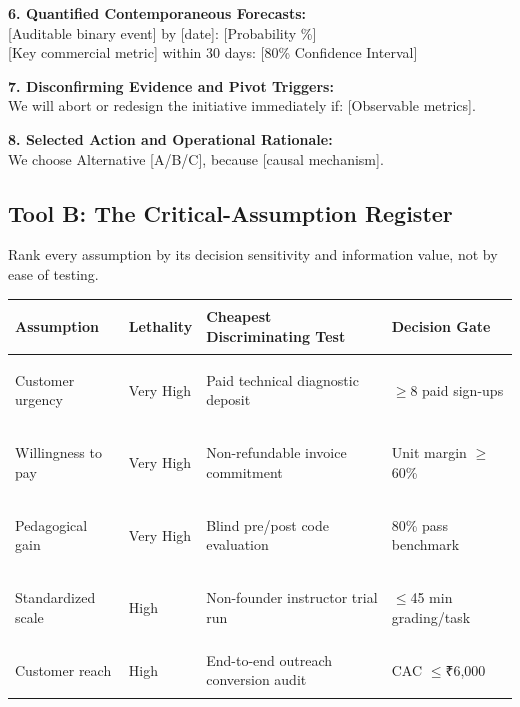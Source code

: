 \begin{tcolorbox}[
  enhanced,
  colback=BayesSurface!60,
  colframe=BayesBorder,
  boxrule=0.5pt,
  arc=3pt,
  left=4pt,right=4pt,top=4pt,bottom=4pt,
  boxsep=1pt
]
\vspace{3pt}
\textbf{6. Quantified Contemporaneous Forecasts:} \\
\textbullet{} [Auditable binary event] by [date]: [Probability \%] \\
\textbullet{} [Key commercial metric] within 30 days: [80\% Confidence Interval]

\vspace{3pt}
\textbf{7. Disconfirming Evidence and Pivot Triggers:} \\
We will abort or redesign the initiative immediately if: [Observable metrics].

\vspace{3pt}
\textbf{8. Selected Action and Operational Rationale:} \\
We choose Alternative [A/B/C], because [causal mechanism].
\end{tcolorbox}

\subsection{Tool B: The Critical-Assumption Register}

Rank every assumption by its decision sensitivity and information value, not by ease of testing.

\begin{tcolorbox}[
  enhanced,
  colback=BayesSurface!60,
  colframe=BayesBorder,
  boxrule=0.5pt,
  arc=3pt,
  left=3pt,right=3pt,top=3pt,bottom=3pt,
  boxsep=1pt
]
\scriptsize
\begin{tabularx}{\linewidth}{>{\bfseries\raggedright\arraybackslash}p{2cm} p{1.5cm} X p{1.6cm}}
\toprule
\textbf{Assumption} & \textbf{Lethality} & \textbf{Cheapest Discriminating Test} & \textbf{Decision Gate} \\
\midrule
Customer urgency & Very High & Paid technical diagnostic deposit & $\ge$8 paid sign-ups \\
\addlinespace[2pt]
Willingness to pay & Very High & Non-refundable invoice commitment & Unit margin $\ge$60\% \\
\addlinespace[2pt]
Pedagogical gain & Very High & Blind pre/post code evaluation & 80\% pass benchmark \\
\addlinespace[2pt]
Standardized scale & High & Non-founder instructor trial run & $\le$45 min grading/task \\
\addlinespace[2pt]
Customer reach & High & End-to-end outreach conversion audit & CAC $\le$₹6,000 \\
\bottomrule
\end{tabularx}
\end{tcolorbox}

